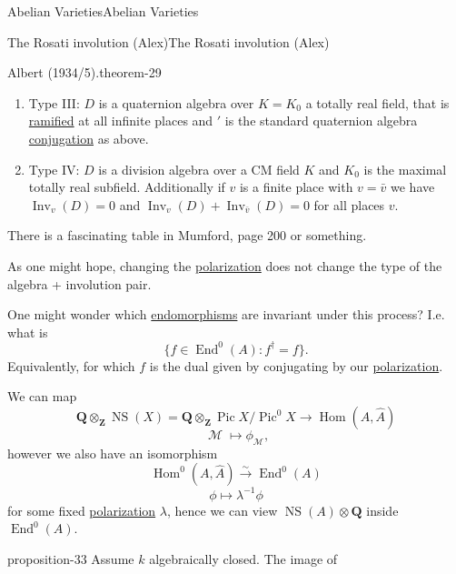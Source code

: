 \documentclass[10pt,]{book}
\numberwithin{equation}{section}
\newcommand{\sheaf}[1]{\operatorname{\mathcal{#1}}}
\newcommand{\inv}{^{-1}}
\newcommand{\ZZ}{\mathbf{Z}}
\newcommand{\QQ}{\mathbf{Q}}
\DeclareMathOperator{\End}{End}
\DeclareMathOperator{\Hom}{Hom}
\DeclareMathOperator{\Pic}{Pic}
\DeclareMathOperator{\NS}{NS}
\begin{document}
\begin{chapterptx}{Abelian Varieties}{}{Abelian Varieties}{}{}
\begin{sectionptx}{The Rosati involution (Alex)}{}{The Rosati involution (Alex)}{}{}
\begin{theorem}{Albert (1934/5).}{}{theorem-29}
\begin{enumerate}
\item\hypertarget{li-58}{}Type III: \(D\) is a quaternion algebra over \(K = K_0\) a totally real field, that is \hyperref[def-dess-ramified]{ramified} at all infinite places and \('\) is the standard quaternion algebra \hyperref[def-quat-alg-conj-trace-norm]{conjugation} as above.%
\item\hypertarget{li-59}{}Type IV: \(D\) is a division algebra over a CM field \(K\) and \(K_0\) is the maximal totally real subfield. Additionally if \(v\) is a finite place with \(v = \bar v\) we have \(\operatorname{Inv}_v(D) = 0\) and \(\operatorname{Inv}_v(D) + \operatorname{Inv}_{\bar v}(D) = 0\) for all places \(v\).%
\end{enumerate}
%
\end{theorem}
\hypertarget{p-347}{}%
There is a fascinating table in Mumford, page 200 or something.%
\par
\hypertarget{p-348}{}%
As one might hope, changing the \hyperref[def-polarization]{polarization} does not change the type of the algebra + involution pair.%
\par
\hypertarget{p-349}{}%
One might wonder which \hyperref[def-supersing-isog-endo]{endomorphisms} are invariant under this process? I.e. what is%
\begin{equation*}
\{f \in \End^0(A) : f^\dagger = f\}\text{.}
\end{equation*}
Equivalently, for which \(f\) is the dual given by conjugating by our \hyperref[def-polarization]{polarization}.%
\par
\hypertarget{p-350}{}%
We can map%
\begin{equation*}
\QQ \otimes_\ZZ \NS(X) = \QQ \otimes_\ZZ \Pic X/\Pic^0 X \to \Hom(A, \hat A)
\end{equation*}
%
\begin{equation*}
\sheaf M \mapsto \phi_{\sheaf M}\text{,}
\end{equation*}
however we also have an isomorphism%
\begin{equation*}
\Hom^0(A, \hat A) \xrightarrow{\sim} \End^0(A)
\end{equation*}
%
\begin{equation*}
\phi \mapsto \lambda\inv \phi
\end{equation*}
for some fixed \hyperref[def-polarization]{polarization} \(\lambda\), hence we can view \(\NS(A)\otimes \QQ\) inside \(\End^0(A)\).%
\begin{proposition}{}{}{proposition-33}%
\hypertarget{p-351}{}%
Assume \(k\) algebraically closed. The image of%

\end{proposition}
\end{sectionptx}
\end{chapterptx}
\end{document}
